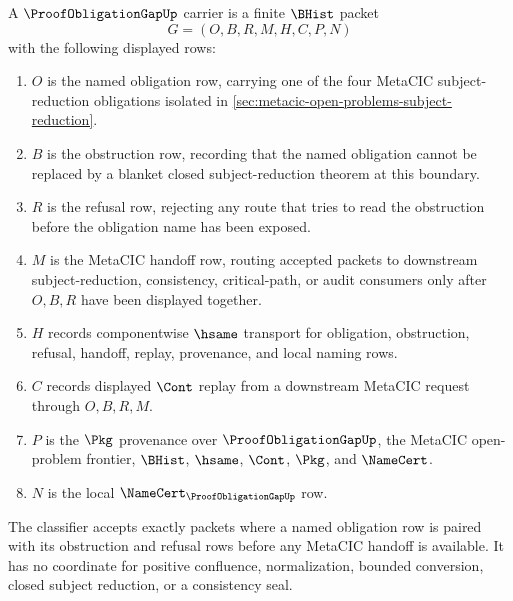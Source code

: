 \begin{definition}
\label{def:proof-obligation-gap-carrier}
A $\ProofObligationGapUp$ carrier is a finite $\BHist$ packet
$$
G=(O,B,R,M,H,C,P,N)
$$
with the following displayed rows:
\begin{enumerate}
\item $O$ is the named obligation row, carrying one of the four MetaCIC subject-reduction obligations isolated in \autoref{sec:metacic-open-problems-subject-reduction}.
\item $B$ is the obstruction row, recording that the named obligation cannot be replaced by a blanket closed subject-reduction theorem at this boundary.
\item $R$ is the refusal row, rejecting any route that tries to read the obstruction before the obligation name has been exposed.
\item $M$ is the MetaCIC handoff row, routing accepted packets to downstream subject-reduction, consistency, critical-path, or audit consumers only after $O,B,R$ have been displayed together.
\item $H$ records componentwise $\hsame$ transport for obligation, obstruction, refusal, handoff, replay, provenance, and local naming rows.
\item $C$ records displayed $\Cont$ replay from a downstream MetaCIC request through $O,B,R,M$.
\item $P$ is the $\Pkg$ provenance over $\ProofObligationGapUp$, the MetaCIC open-problem frontier, $\BHist$, $\hsame$, $\Cont$, $\Pkg$, and $\NameCert$.
\item $N$ is the local $\NameCert_{\ProofObligationGapUp}$ row.
\end{enumerate}
The classifier accepts exactly packets where a named obligation row is paired with its obstruction and refusal rows before any MetaCIC handoff is available. It has no coordinate for positive confluence, normalization, bounded conversion, closed subject reduction, or a consistency seal.
\end{definition}

